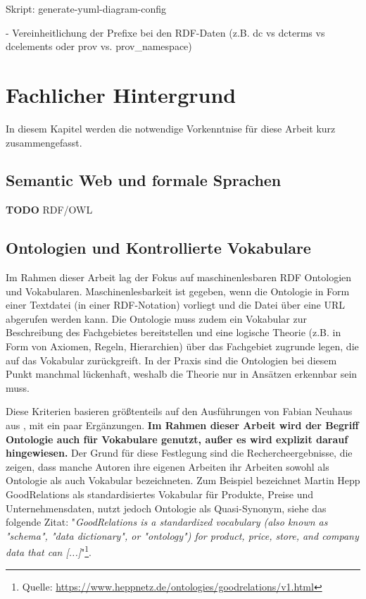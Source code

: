 \documentclass{article}
\begin{document}
Skript: generate-yuml-diagram-config

- Vereinheitlichung der Prefixe bei den RDF-Daten (z.B. dc vs dcterms vs dcelements oder prov vs. prov\_namespace)

\section{Fachlicher Hintergrund}

In diesem Kapitel werden die notwendige Vorkenntnise für diese Arbeit kurz zusammengefasst.

\subsection{Semantic Web und formale Sprachen}

\textbf{TODO}
RDF/OWL

\subsection{Ontologien und Kontrollierte Vokabulare}

Im Rahmen dieser Arbeit lag der Fokus auf maschinenlesbaren RDF Ontologien und Vokabularen.
Maschinenlesbarkeit ist gegeben, wenn die Ontologie in Form einer Textdatei (in einer RDF-Notation) vorliegt und die Datei über eine URL abgerufen werden kann.
Die Ontologie muss zudem ein Vokabular zur Beschreibung des Fachgebietes bereitstellen und eine logische Theorie (z.B. in Form von Axiomen, Regeln, Hierarchien) über das Fachgebiet zugrunde legen, die auf das Vokabular zurückgreift.
In der Praxis sind die Ontologien bei diesem Punkt manchmal lückenhaft, weshalb die Theorie nur in Ansätzen erkennbar sein muss.

Diese Kriterien basieren größtenteils auf den Ausführungen von Fabian Neuhaus aus \cite{neuhaus2018ontology}, mit ein paar Ergänzungen.
\textbf{Im Rahmen dieser Arbeit wird der Begriff Ontologie auch für Vokabulare genutzt, außer es wird explizit darauf hingewiesen.}
Der Grund für diese Festlegung sind die Rechercheergebnisse, die zeigen, dass manche Autoren ihre eigenen Arbeiten ihr Arbeiten sowohl als Ontologie als auch Vokabular bezeichneten.
Zum Beispiel bezeichnet Martin Hepp GoodRelations als standardisiertes Vokabular für Produkte, Preise und Unternehmensdaten, nutzt jedoch Ontologie als Quasi-Synonym, siehe das folgende Zitat: "\textit{GoodRelations is a standardized vocabulary (also known as "schema", "data dictionary", or "ontology") for product, price, store, and company data that can [...]}"\footnote{Quelle: \url{https://www.heppnetz.de/ontologies/goodrelations/v1.html}}.
\end{document}
